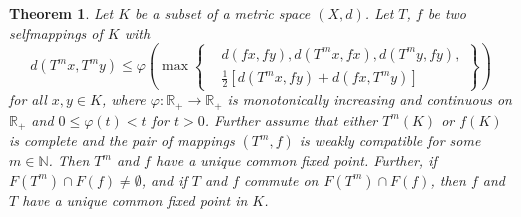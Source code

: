 \documentclass[a4paper,12pt,oneside]{article}
\newtheorem{theorem}{Theorem}[section]
\numberwithin{equation}{section}
\begin{document}
\begin{theorem}\label{thrm 4.1}
    Let \(K\) be a subset of a metric space \((X,d)\). Let \(T\), \(f\) be two selfmappings of \(K\) with
\begin{equation} \label{(4.1.1)}
d(T^{m}x,T^{m}y) \leq \varphi\left(\max\left\{
\begin{aligned}
&d(fx,fy), d(T^{m}x,fx), d(T^{m}y, fy), \\
&\frac{1}{2}[d(T^{m}x,fy) + d(fx,T^{m}y)]
\end{aligned}
\right\}\right)
\end{equation}
for all \(x,y \in K\), where \(\varphi:\mathbb{R}_{+} \to \mathbb{R}_{+}\) is monotonically increasing and continuous on \(\mathbb{R}_{+}\) and \(0 \leq \varphi(t) < t\) for \(t > 0\). Further assume that either \(T^{m}(K)\) or \(f(K)\) is complete and the pair of mappings \((T^{m},f)\) is weakly compatible for some \(m \in \mathbb{N}\). Then \(T^{m}\) and \(f\) have a unique common fixed point. Further, if \(F(T^{m}) \cap F(f) \neq \emptyset\), and if \(T\) and \(f\) commute on \(F(T^{m}) \cap F(f)\), then \(f\) and \(T\) have a unique common fixed point in \(K\).
\end{theorem}
\end{document}
